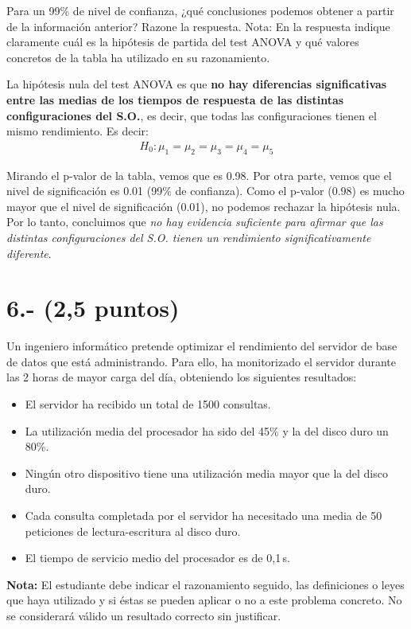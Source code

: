 \documentclass[a4paper,12pt]{article}
\begin{document}
Para un 99\% de nivel de confianza, ¿qué conclusiones podemos obtener a partir de la información anterior? Razone la respuesta. Nota: En la respuesta indique claramente cuál es la hipótesis de partida del test ANOVA y qué valores concretos de la tabla ha utilizado en su razonamiento.


La hipótesis nula del test ANOVA es que \textbf{no hay diferencias significativas entre las medias de los tiempos de respuesta de las distintas configuraciones del S.O.}, es decir, que todas las configuraciones tienen el mismo rendimiento. Es decir:
\begin{align*}
    H_0: \mu_1 = \mu_2 = \mu_3 = \mu_4 = \mu_5
\end{align*}

Mirando el p-valor de la tabla, vemos que es 0.98. Por otra parte, vemos que el nivel de significación es 0.01 (99\% de confianza). Como el p-valor (0.98) es mucho mayor que el nivel de significación (0.01), no podemos rechazar la hipótesis nula.
Por lo tanto, concluimos que \textit{no hay evidencia suficiente para afirmar que las distintas configuraciones del S.O. tienen un rendimiento significativamente diferente}. 

\section*{6.- (2,5 puntos)}
Un ingeniero informático pretende optimizar el rendimiento del servidor de base de datos que está administrando. Para ello, ha monitorizado el servidor durante las 2 horas de mayor carga del día, obteniendo los siguientes resultados:
\begin{itemize}
    \item El servidor ha recibido un total de 1500 consultas.
    \item La utilización media del procesador ha sido del 45\% y la del disco duro un 80\%.
    \item Ningún otro dispositivo tiene una utilización media mayor que la del disco duro.
    \item Cada consulta completada por el servidor ha necesitado una media de 50 peticiones de lectura-escritura al disco duro.
    \item El tiempo de servicio medio del procesador es de 0,1\,s.
\end{itemize}

\textbf{Nota:} El estudiante debe indicar el razonamiento seguido, las definiciones o leyes que haya utilizado y si éstas se pueden aplicar o no a este problema concreto. No se considerará válido un resultado correcto sin justificar. \\
\end{document}
